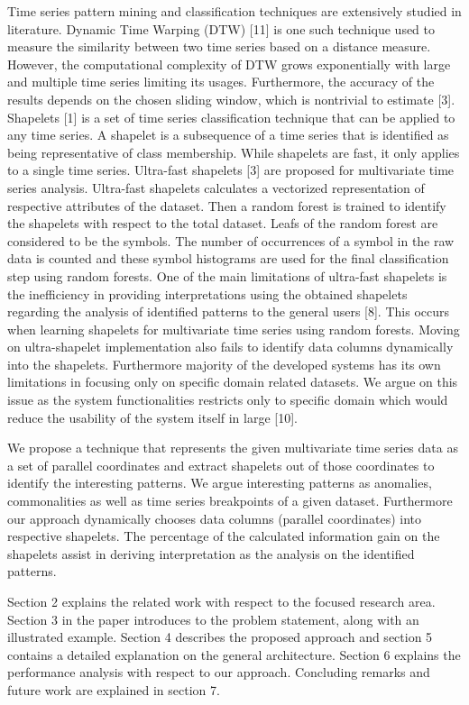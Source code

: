 \documentclass[letterpaper, 10 pt, conference]{IEEEtran}  %
\begin{document}
Time series pattern mining and classification techniques are extensively studied in literature. Dynamic Time Warping (DTW) [11] is one such technique used to measure the similarity between two time series based on a distance measure. However, the computational complexity of DTW grows exponentially with large and multiple time series limiting its usages. Furthermore, the accuracy of the results depends on the chosen sliding window, which is nontrivial to estimate [3]. Shapelets [1] is a set of time series classification technique that can be applied to any time series. A shapelet is a subsequence of a time series that is identified as being representative of class membership. While shapelets are fast, it only applies to a single time series. Ultra-fast shapelets [3] are proposed for multivariate time series analysis. Ultra-fast shapelets calculates a vectorized representation of respective attributes of the dataset. Then a  random forest is trained to identify the shapelets with respect to the total dataset. Leafs of the random forest are considered to be the symbols. The number of occurrences of a symbol in the raw data is counted and these symbol histograms are used for the final classification step using random forests. One of the main limitations of ultra-fast shapelets is the inefficiency in providing interpretations using the obtained shapelets regarding the analysis of identified patterns to the general users [8]. This occurs when learning shapelets for multivariate time series using random forests. Moving on ultra-shapelet implementation also fails to identify data columns dynamically into the shapelets. 
Furthermore majority of the developed systems has its own limitations in focusing only on specific domain related datasets. We argue on this issue as the system functionalities restricts only to specific domain which would reduce the usability of the system itself in large [10].

We propose a technique that represents the given multivariate time series data as a set of parallel coordinates and extract shapelets out of those coordinates to identify the interesting patterns. We argue interesting patterns as  anomalies, commonalities as well as time series breakpoints of a given dataset. Furthermore our approach dynamically chooses data columns (parallel coordinates) into respective shapelets. The percentage of the calculated information gain on the shapelets assist in deriving interpretation as the analysis on the identified patterns. 

Section 2 explains the related work with respect to the focused research area. Section 3 in the paper introduces to the problem statement, along with an illustrated example. Section 4 describes the proposed approach and section 5 contains a detailed explanation on the general architecture. Section 6 explains the performance analysis with respect to our approach. Concluding remarks and future work are explained in section 7.
\end{document}
